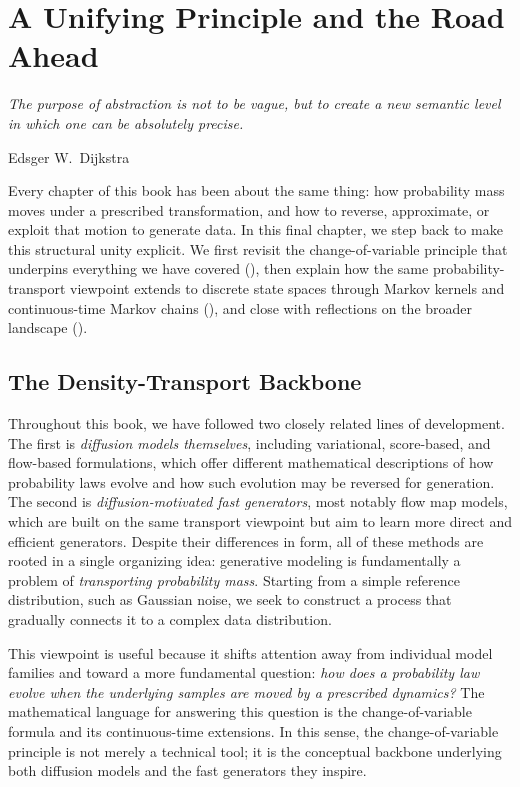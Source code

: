\chapter{A Unifying Principle and the Road Ahead}\label{ch:epilogue}

\epigraph{\textit{The purpose of abstraction is not to be vague, but to create a new semantic level in which one can be absolutely precise.}}{Edsger W.\ Dijkstra}

Every chapter of this book has been about the same thing: how probability mass moves under a prescribed transformation, and how to reverse, approximate, or exploit that motion to generate data. In this final chapter, we step back to make this structural unity explicit. We first revisit the change-of-variable principle that underpins everything we have covered (), then explain how the same probability-transport viewpoint extends to discrete state spaces through Markov kernels and continuous-time Markov chains (), and close with reflections on the broader landscape ().

\clearpage
\newpage

\section{The Density-Transport Backbone}\label{sec:epilogue-backbone}

Throughout this book, we have followed two closely related lines of development.
The first is \emph{diffusion models themselves}, including variational, score-based, and flow-based formulations, which offer different mathematical descriptions of how probability laws evolve and how such evolution may be reversed for generation.
The second is \emph{diffusion-motivated fast generators}, most notably flow map models, which are built on the same transport viewpoint but aim to learn more direct and efficient generators.
Despite their differences in form, all of these methods are rooted in a single organizing idea: generative modeling is fundamentally a problem of \emph{transporting probability mass}. Starting from a simple reference distribution, such as Gaussian noise, we seek to construct a process that gradually connects it to a complex data distribution.

This viewpoint is useful because it shifts attention away from individual model families and toward a more fundamental question:
\emph{how does a probability law evolve when the underlying samples are moved by a prescribed dynamics?}
The mathematical language for answering this question is the change-of-variable formula and its continuous-time extensions. In this sense, the change-of-variable principle is not merely a technical tool; it is the conceptual backbone underlying both diffusion models and the fast generators they inspire.

